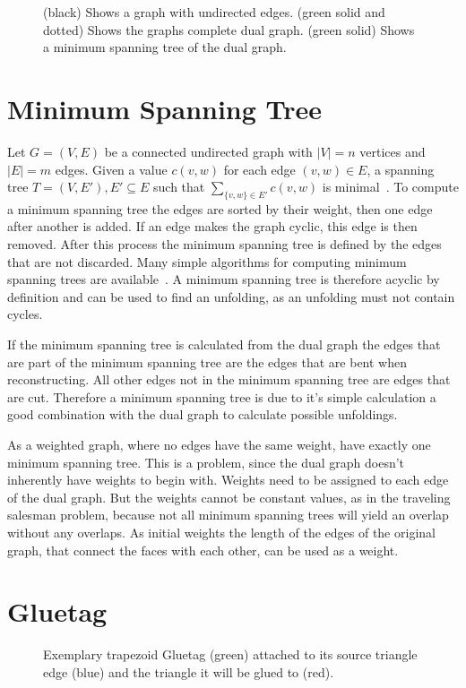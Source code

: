 \documentclass[draft,final]{vutinfth} %
\begin{document}
\begin{figure}

\caption{(black) Shows a graph with undirected edges. (green solid and dotted) Shows the graphs complete dual graph. (green solid) Shows a minimum spanning tree of the dual graph.}
\label{fig:dualgraph}
\end{figure}

\section{Minimum Spanning Tree}

Let $G = (V,E)$ be a connected undirected graph with $|V| = n$ vertices and $|E| = m$ edges. Given a value $c(v,w)$ for each edge $(v,w) \in E$, a spanning tree $T = (V,E'), E' \subseteq E$ such that $\sum_{\{v,w\}\in E'} c(v,w)$ is minimal~\cite{cheriton1976finding}. To compute a minimum spanning tree the edges are sorted by their weight, then one edge after another is added. If an edge makes the graph cyclic, this edge is then removed. After this process the minimum spanning tree is defined by the edges that are not discarded. Many simple algorithms for computing minimum spanning trees are available~\cite{kruskal1956shortest,ahuja1990faster}. A minimum spanning tree is therefore acyclic by definition and can be used to find an unfolding, as an unfolding must not contain cycles. 

If the minimum spanning tree is calculated from the dual graph the edges that are part of the minimum spanning tree are the edges that are bent when reconstructing. All other edges not in the minimum spanning tree are edges that are cut. Therefore a minimum spanning tree is due to it's simple calculation a good combination with the dual graph to calculate possible unfoldings. 

As a weighted graph, where no edges have the same weight, have exactly one minimum spanning tree. This is a problem, since the dual graph doesn't inherently have weights to begin with. Weights need to be assigned to each edge of the dual graph. But the weights cannot be constant values, as in the traveling salesman problem, because not all minimum spanning trees will yield an overlap without any overlaps. 
As initial weights the length of the edges of the original graph, that connect the faces with each other, can be used as a weight.

\section{Gluetag}
\begin{figure}

\caption{Exemplary trapezoid Gluetag (green) attached to its source triangle edge (blue) and the triangle it will be glued to (red).}
\label{fig:Gluetag}
\end{figure}
\end{document}
